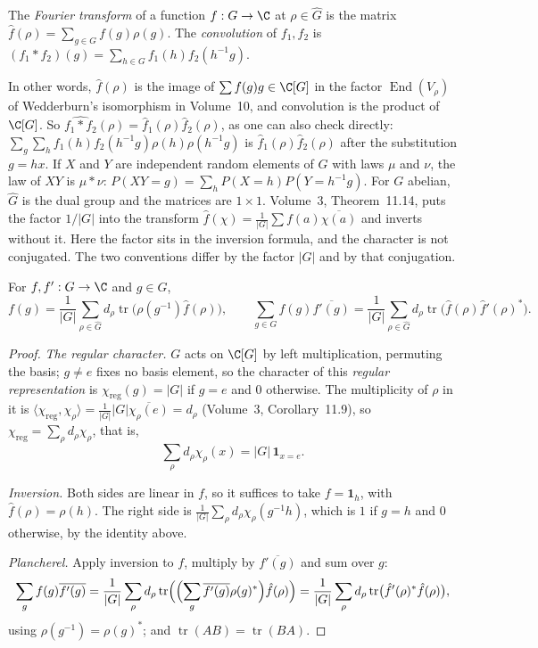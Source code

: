\begin{definition}\label{def:fouriergroup}
The \emph{Fourier transform} of a function $f:G\to\C$ at $\rho\in\widehat G$ is the matrix $\hat f(\rho)=\sum_{g\in G}f(g)\rho(g)$. The \emph{convolution} of $f_1,f_2$ is $(f_1*f_2)(g)=\sum_{h\in G}f_1(h)f_2(h^{-1}g)$.
\end{definition}

In other words, $\hat f(\rho)$ is the image of $\sum f(g)g\in\C[G]$ in the factor $\operatorname{End}(V_\rho)$ of Wedderburn's isomorphism in Volume~10, and convolution is the product of $\C[G]$. So $\widehat{f_1*f_2}(\rho)=\hat f_1(\rho)\hat f_2(\rho)$, as one can also
check directly: $\sum_g\sum_hf_1(h)f_2(h^{-1}g)\rho(h)\rho(h^{-1}g)$ is $\hat f_1(\rho)\hat f_2(\rho)$ after the substitution $g=hx$. If $X$ and $Y$ are independent random elements of $G$ with laws $\mu$ and $\nu$, the law of $XY$ is $\mu*\nu$: $P(XY=g)=\sum_hP(X=h)P(Y=h^{-1}g)$.
For $G$ abelian, $\widehat G$ is the dual group and the matrices are $1\times1$. Volume~3, Theorem~11.14, puts the factor $1/|G|$ into the transform $\hat f(\chi)=\frac1{|G|}\sum f(a)\overline{\chi(a)}$ and inverts without it. Here the factor sits in the inversion formula, and the character is not conjugated. The two conventions differ by the factor $|G|$ and by that conjugation.

\begin{theorem}\label{thm:plancherelG}
For $f,f':G\to\C$ and $g\in G$,
\[
f(g)=\frac1{|G|}\sum_{\rho\in\widehat G}d_\rho\operatorname{tr}\bigl(\rho(g^{-1})\hat f(\rho)\bigr),\qquad
\sum_{g\in G}f(g)\overline{f'(g)}=\frac1{|G|}\sum_{\rho\in\widehat G}d_\rho\operatorname{tr}\bigl(\hat f(\rho)\hat f'(\rho)^*\bigr).
\]
\end{theorem}

\begin{proof}
\emph{The regular character.} $G$ acts on $\C[G]$ by left multiplication, permuting the basis; $g\ne e$ fixes no basis element, so the character of this \emph{regular representation} is $\chi_{\mathrm{reg}}(g)=|G|$ if $g=e$ and $0$ otherwise. The multiplicity of
$\rho$ in it is $\langle\chi_{\mathrm{reg}},\chi_\rho\rangle=\frac1{|G|}|G|\overline{\chi_\rho(e)}=d_\rho$ (Volume~3, Corollary~11.9), so $\chi_{\mathrm{reg}}=\sum_\rho d_\rho\chi_\rho$, that is,
\[
\sum_{\rho}d_\rho\chi_\rho(x)=|G|\,\mathbf 1_{x=e}.
\]

\emph{Inversion.} Both sides are linear in $f$, so it suffices to take $f=\mathbf 1_h$, with $\hat f(\rho)=\rho(h)$. The right side is $\frac1{|G|}\sum_\rho d_\rho\chi_\rho(g^{-1}h)$, which is $1$ if $g=h$ and $0$ otherwise, by the identity above.

\emph{Plancherel.} Apply inversion to $f$, multiply by $\overline{f'(g)}$ and sum over $g$:
\[
\sum_gf(g)\overline{f'(g)}=\frac1{|G|}\sum_\rho d_\rho\operatorname{tr}\Bigl(\Bigl(\sum_g\overline{f'(g)}\rho(g)^*\Bigr)\hat f(\rho)\Bigr)=\frac1{|G|}\sum_\rho d_\rho\operatorname{tr}\bigl(\hat f'(\rho)^*\hat f(\rho)\bigr),
\]
using $\rho(g^{-1})=\rho(g)^*$; and $\operatorname{tr}(AB)=\operatorname{tr}(BA)$.
\end{proof}

